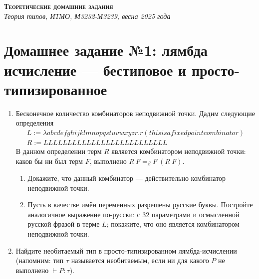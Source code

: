 \documentclass[10pt,a4paper,oneside]{article}
\begin{document}
\begin{center}{\Large\textsc{\textbf{Теоретические домашние задания}}}\\
             \it Теория типов, ИТМО, М3232-М3239, весна 2025 года\end{center}

\section*{Домашнее задание №1: лямбда исчисление --- бестиповое и просто-типизированное}

\begin{enumerate}
\item Бесконечное количество комбинаторов неподвижной точки. Дадим следующие определения
$$\begin{array}{l}
L := \lambda abcdefghijklmnopqstuvwxyzr.r(thisisafixedpointcombinator)\\
R := LLLLLLLLLLLLLLLLLLLLLLLLLL\end{array}$$
В данном определении терм $R$ является комбинатором неподвижной точки: каков бы ни был терм
$F$, выполнено $R\ F =_\beta F\ (R\ F)$.
\begin{enumerate}
\item Докажите, что данный комбинатор --- действительно комбинатор неподвижной точки.
\item Пусть в качестве имён переменных разрешены русские буквы. Постройте аналогичное выражение
по-русски: с 32 параметрами и осмысленной русской фразой в терме $L$; покажите, что оно является
комбинатором неподвижной точки.
\end{enumerate}

\item Найдите необитаемый тип в просто-типизированном лямбда-исчислении (напомним: тип $\tau$ 
называется необитаемым, если ни для какого $P$ не выполнено $\vdash P : \tau$).

\begin{comment}
\item Напомним определение: комбинатор --- лямбда-выражение без свободных переменных. Также напомним:
$$\begin{array}{l}
S := \lambda x.\lambda y.\lambda z.x\ z\ (y\ z)\\
K := \lambda x.\lambda y.x\\
I := \lambda x.x
\end{array}$$

Известна теорема о том, что для любого комбинатора $X$ можно найти выражение $P$
(состоящее только из скобок, пробелов и комбинаторов $S$ и $K$), что $X =_\beta P$.
Будем говорить, что комбинатор $P$ \emph{выражает} комбинатор $X$ в базисе $SK$.


\end{comment}
\end{enumerate}
\end{document}
